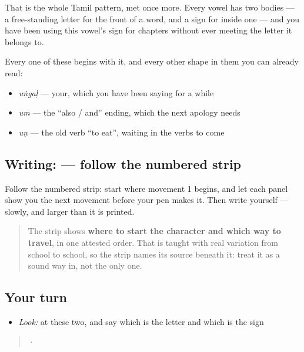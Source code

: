 That is the whole Tamil pattern, met once more. Every vowel has two bodies — a free-standing letter for the front of a word, and a sign for inside one — and you have been using this vowel's sign for chapters without ever meeting the letter it belongs to.

Every one of these begins with it, and every other shape in them you can already read:

\begin{itemize}
\raggedright
  \item \textbf{} \emph{uṅgaḷ} — your, which you have been saying for a while
  \item \textbf{} \emph{um} — the \textquotedblleft{}also / and\textquotedblright{} ending, which the next apology needs
  \item \textbf{} \emph{uṇ} — the old verb \textquotedblleft{}to eat\textquotedblright{}, waiting in the verbs to come
\end{itemize}

\subsection*{Writing:  — follow the numbered strip}

Follow the numbered strip: start where movement 1 begins, and let each panel show you the next movement before your pen makes it. Then write  yourself — slowly, and larger than it is printed.

\begin{quote}
The strip shows \textbf{where to start the character and which way to travel}, in one attested order. That is taught with real variation from school to school, so the strip names its source beneath it: treat it as a sound way in, not the only one.
\end{quote}

\subsection*{Your turn}
\begin{itemize}
\raggedright
  \item \emph{Look:} at these two, and say which is the letter and which is the sign
\end{itemize}

\begin{quote}
  ·  
\end{quote}

